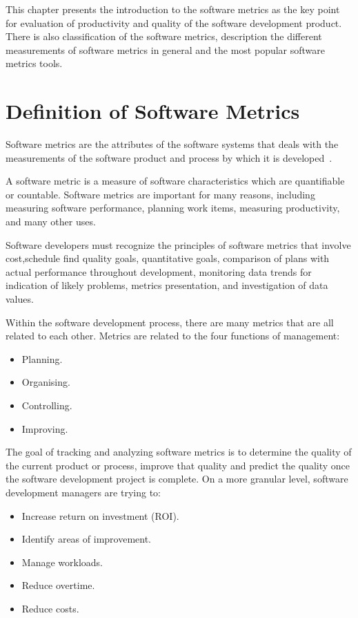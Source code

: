 This chapter presents the introduction to the software metrics as the key point for evaluation of productivity and quality of the software development product. There is also classification of the software metrics, description the different measurements of software metrics in general and the most popular software metrics tools.


\section{Definition of Software Metrics}

Software metrics are the attributes of the software systems that deals with the measurements of the software product and process by which it is developed~\cite{metrix}.
 
A software metric is a measure of software characteristics which are quantifiable or countable. Software metrics are important for many reasons, including measuring software performance, planning work items, measuring productivity, and many other uses.

Software developers must recognize the principles of software metrics that involve cost,schedule find quality goals, quantitative goals, comparison of plans with actual performance throughout development, monitoring data trends for indication of likely problems, metrics presentation, and investigation of data values.

Within the software development process, there are many metrics that are all related to each other. Metrics are related to the four functions of management:

\begin{itemize}
	\item Planning.
	\item Organising.
	\item Controlling.
	\item Improving.
\end{itemize}

The goal of tracking and analyzing software metrics is to determine the quality of the current product or process, improve that quality and predict the quality once the software development project is complete. On a more granular level, software development managers are trying to:

\begin{itemize}
	\item Increase return on investment (ROI).
	\item Identify areas of improvement.
	\item Manage workloads.
	\item Reduce overtime.
	\item Reduce costs.
\end{itemize}

